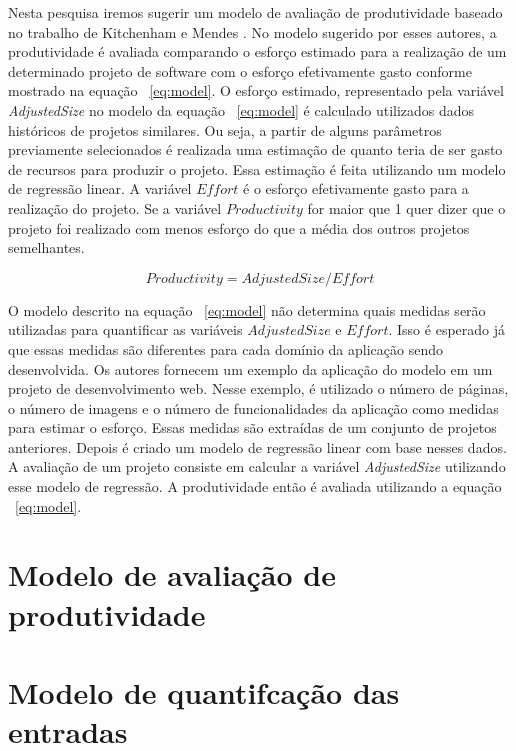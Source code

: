  Nesta pesquisa iremos sugerir um modelo de avaliação de produtividade baseado no trabalho de  Kitchenham e Mendes \cite{kitchenham2004software}. No modelo sugerido por esses autores, a produtividade é avaliada comparando o esforço estimado para a realização de um determinado projeto de software com o esforço efetivamente gasto conforme mostrado na equação ~\ref{eq:model}. O esforço estimado, representado pela variável \textit{AdjustedSize} no modelo da equação ~\ref{eq:model} é calculado utilizados dados históricos de projetos similares. Ou seja, a partir de alguns parâmetros previamente selecionados é realizada uma estimação de quanto teria de ser gasto de recursos para produzir o projeto. Essa estimação é feita utilizando um modelo de regressão linear.  A variável $Effort$ é o esforço efetivamente gasto para a realização do projeto. Se a variável $Productivity$ for maior que 1 quer dizer que o projeto foi realizado com menos esforço do que a média dos outros projetos semelhantes.
 
 
 

\begin{equation}
\label{eq:model}
  Productivity = AdjustedSize/Effort
\end{equation}


O modelo descrito na equação ~\ref{eq:model} não determina quais medidas serão utilizadas para quantificar as variáveis $AdjustedSize$ e $Effort$. Isso é esperado já que essas medidas são diferentes para cada domínio da aplicação sendo desenvolvida. Os autores fornecem um exemplo da aplicação do modelo em um projeto de desenvolvimento web. Nesse exemplo, é utilizado o número de páginas, o número de imagens e o número de funcionalidades da aplicação como medidas para estimar o esforço. Essas medidas são extraídas de um conjunto de projetos anteriores. Depois é criado um modelo de regressão linear com base nesses dados. A avaliação de um projeto consiste em calcular a variável \textit{AdjustedSize} utilizando esse modelo de regressão. A produtividade então é avaliada utilizando a equação ~\ref{eq:model}.

\section{Modelo de avaliação de produtividade}




\section{Modelo de quantifcação das entradas}

